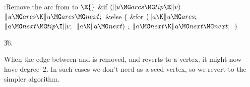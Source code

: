 \B{}:Remove the arc from  to \X${}\E{}$%
\6
\&{if} ${}(\|u\MG\\{arcs}\MG\\{tip}\E\|v){}$\1\5
${}\|u\MG\\{arcs}\K\|u\MG\\{arcs}\MG\\{next};{}$\2\6
\&{else}\5
${}\{{}$\1\6
\&{for} ${}(\|a\K\|u\MG\\{arcs};{}$ ${}\|a\MG\\{next}\MG\\{tip}\I\|v;{}$ ${}\|a%
\K\|a\MG\\{next}){}$\1\5
;\2\6
${}\|a\MG\\{next}\K\|a\MG\\{next}\MG\\{next};{}$\6
\4${}\}{}$\2\par
\U36.\fi

When the edge between  and  is removed,
and  reverts to a
 vertex, it might now have degree~2. In such cases we don't
need  as a seed vertex, so we revert to the simpler algorithm.

